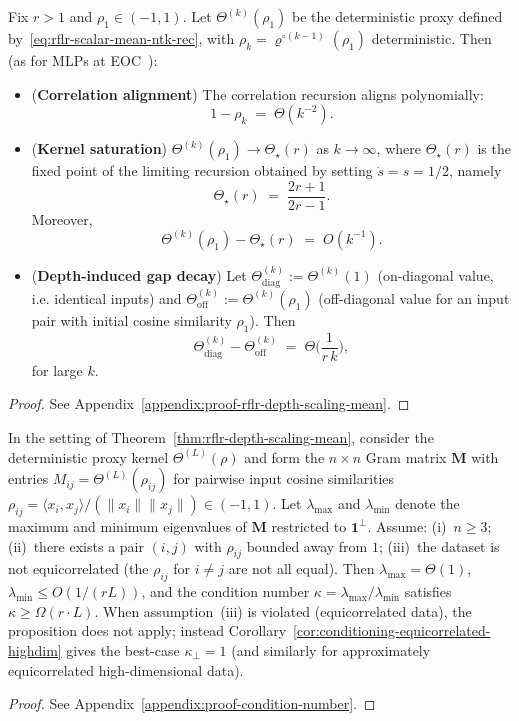 \begin{theorem}\label{thm:rflr-depth-scaling-mean}
Fix \(r>1\) and \(\rho_1\in(-1,1)\). Let \(\Theta^{(k)}(\rho_1)\) be the deterministic proxy defined by~\eqref{eq:rflr-scalar-mean-ntk-rec}, with \(\rho_k = \varrho^{\circ(k-1)}(\rho_1)\) deterministic. Then (as for MLPs at EOC~\cite{terjek2025mlpsateoc,pmlr-v163-hayou22a}):
\begin{itemize}
  \item (\textbf{Correlation alignment}) The correlation recursion aligns polynomially:
  \[
  1-\rho_k \;=\; \Theta(k^{-2}).
  \]
  \item (\textbf{Kernel saturation}) \(\Theta^{(k)}(\rho_1)\to \Theta_\star(r)\) as \(k\to\infty\), where \(\Theta_\star(r)\) is the fixed point of the limiting recursion obtained by setting \(\dot{s}=s=1/2\), namely
  \[
  \Theta_\star(r) \;=\; \frac{2r+1}{2r-1}.
  \]
  Moreover,
  \[
  \Theta^{(k)}(\rho_1)-\Theta_\star(r) \;=\; O(k^{-1}).
  \]
  \item (\textbf{Depth-induced gap decay}) Let \(\Theta^{(k)}_{\mathrm{diag}}:=\Theta^{(k)}(1)\) (on-diagonal value, i.e. identical inputs) and \(\Theta^{(k)}_{\mathrm{off}}:=\Theta^{(k)}(\rho_1)\) (off-diagonal value for an input pair with initial cosine similarity \(\rho_1\)). Then
  \[
  \Theta^{(k)}_{\mathrm{diag}}-\Theta^{(k)}_{\mathrm{off}} \;=\; \Theta\!\Big(\frac{1}{r\,k}\Big),
  \]
  for large \(k\).
\end{itemize}
\end{theorem}

\begin{proof}
See Appendix~\ref{appendix:proof-rflr-depth-scaling-mean}.
\end{proof}

\begin{proposition}\label{prop:condition-number-depth}
In the setting of Theorem~\ref{thm:rflr-depth-scaling-mean}, consider the deterministic proxy kernel \(\Theta^{(L)}(\rho)\) and form the \(n\times n\) Gram matrix \(\mathbf{M}\) with entries \(M_{ij}=\Theta^{(L)}(\rho_{ij})\) for pairwise input cosine similarities \(\rho_{ij}=\langle x_i,x_j\rangle/(\|x_i\|\|x_j\|)\in(-1,1)\). Let \(\lambda_{\max}\) and \(\lambda_{\min}\) denote the maximum and minimum eigenvalues of \(\mathbf{M}\) restricted to \(\mathbf{1}^\perp\). Assume: (i)~\(n\ge 3\); (ii)~there exists a pair \((i,j)\) with \(\rho_{ij}\) bounded away from \(1\); (iii)~the dataset is not equicorrelated (the \(\rho_{ij}\) for \(i\neq j\) are not all equal). Then \(\lambda_{\max}=\Theta(1)\), \(\lambda_{\min}\le O(1/(rL))\), and the condition number \(\kappa=\lambda_{\max}/\lambda_{\min}\) satisfies \(\kappa\ge\Omega(r\cdot L)\). When assumption~(iii) is violated (equicorrelated data), the proposition does not apply; instead Corollary~\ref{cor:conditioning-equicorrelated-highdim} gives the best-case \(\kappa_\perp=1\) (and similarly for approximately equicorrelated high-dimensional data).
\end{proposition}
\begin{proof}
See Appendix~\ref{appendix:proof-condition-number}.
\end{proof}

